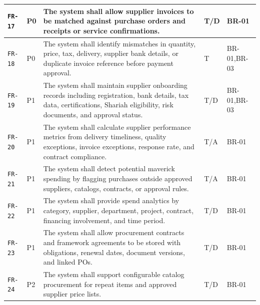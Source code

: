 \documentclass[11pt,a4paper]{article}
\begin{document}
\begin{footnotesize}
\begin{longtable}{@{}p{}p{}p{}p{}p{}@{}}
\texttt{FR-17} & P0 & The system shall allow supplier invoices to be matched against purchase orders and receipts or service confirmations. & T/D & BR-01 \\ \hline
\texttt{FR-18} & P0 & The system shall identify mismatches in quantity, price, tax, delivery, supplier bank details, or duplicate invoice reference before payment approval. & T & BR-01,BR-03 \\ \hline
\texttt{FR-19} & P1 & The system shall maintain supplier onboarding records including registration, bank details, tax data, certifications, Shariah eligibility, risk documents, and approval status. & T/D & BR-01,BR-03 \\ \hline
\texttt{FR-20} & P1 & The system shall calculate supplier performance metrics from delivery timeliness, quality exceptions, invoice exceptions, response rate, and contract compliance. & T/A & BR-01 \\ \hline
\texttt{FR-21} & P1 & The system shall detect potential maverick spending by flagging purchases outside approved suppliers, catalogs, contracts, or approval rules. & T/A & BR-01 \\ \hline
\texttt{FR-22} & P1 & The system shall provide spend analytics by category, supplier, department, project, contract, financing involvement, and time period. & T/D & BR-01 \\ \hline
\texttt{FR-23} & P1 & The system shall allow procurement contracts and framework agreements to be stored with obligations, renewal dates, document versions, and linked POs. & T/D & BR-01 \\ \hline
\texttt{FR-24} & P2 & The system shall support configurable catalog procurement for repeat items and approved supplier price lists. & T/D & BR-01 \\ \hline
\end{longtable}
\end{footnotesize}
\end{document}
